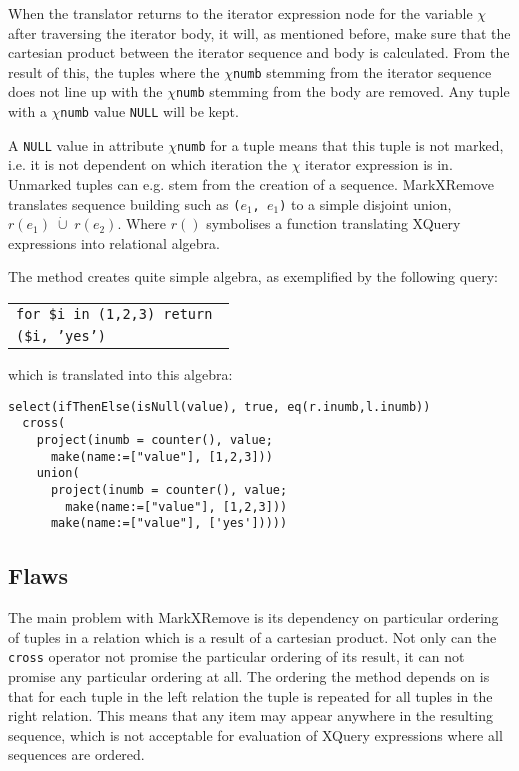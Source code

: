 When the translator returns to the iterator expression node for the variable $\chi$ after traversing the iterator
body, it will, as mentioned before, make sure that the cartesian product between the iterator sequence and body is
calculated. From the result of this, the tuples where the $\chi$\texttt{numb} stemming from the iterator
sequence does not line up with the $\chi$\texttt{numb} stemming from the body are removed. Any tuple with a
$\chi$\texttt{numb} value \texttt{NULL} will be kept.

A \texttt{NULL} value in attribute $\chi$\texttt{numb} for a tuple means that this tuple is not marked, i.e. it is
not dependent on which iteration the $\chi$ iterator expression is in. Unmarked
tuples can e.g. stem from the creation of a sequence. MarkXRemove translates sequence building such as \texttt{(}$e_{1}$\texttt{,
}$e_{1}$\texttt{)} to a simple disjoint union, $r(e_{1})\;\dot\cup\;r(e_{2})$. Where $r()$ symbolises a function
translating XQuery expressions into relational algebra.

The method creates quite simple algebra, as exemplified by the following query:

\begin{center}
\begin{tabular}{l}
\texttt{for \$i in (1,2,3) return } \\ \qquad
\texttt{(\$i, 'yes')}
\end{tabular}
\end{center}

which is translated into this algebra:

\begin{Verbatim}
select(ifThenElse(isNull(value), true, eq(r.inumb,l.inumb))
  cross(
    project(inumb = counter(), value;
      make(name:=["value"], [1,2,3]))
    union(
      project(inumb = counter(), value;
        make(name:=["value"], [1,2,3]))
      make(name:=["value"], ['yes']))))
\end{Verbatim} 

\subsection{Flaws}
\label{sect:trans:mxr:flaws}
The main problem with MarkXRemove is its dependency on particular ordering of
tuples in a relation which is a result of a cartesian product. Not only can the \texttt{cross} operator not promise the particular ordering
of its result, it can not promise any particular ordering at all. The ordering the method depends on is that for
each tuple in the left relation the tuple is repeated for all tuples in the right relation. This means that any
item may appear anywhere in the resulting sequence, which is not acceptable for
evaluation of XQuery expressions where all sequences are ordered.


